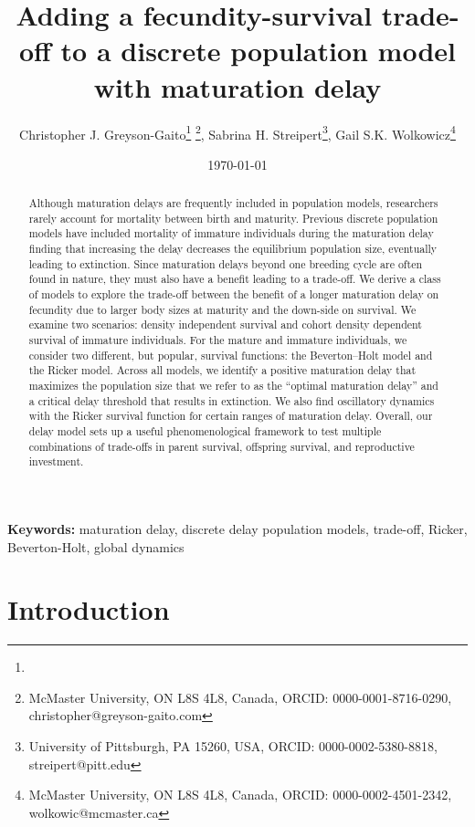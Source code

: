 \documentclass{article}
\title{Adding a fecundity-survival trade-off to a discrete population model with maturation delay}
\author{Christopher J. Greyson-Gaito\thanks{\equalcontrib} \footnote{McMaster University, ON L8S 4L8, Canada, ORCID: 0000-0001-8716-0290, christopher@greyson-gaito.com}, Sabrina H. Streipert\footnotemark[1] \footnote{University of Pittsburgh, PA 15260, USA, ORCID: 0000-0002-5380-8818, streipert@pitt.edu}, Gail S.K. Wolkowicz\footnotemark[1] \footnote{McMaster University, ON L8S 4L8, Canada, ORCID: 0000-0002-4501-2342, wolkowic@mcmaster.ca}}
\date{\today}
\numberwithin{theorem}{section}
\begin{document}
\maketitle


\begin{abstract}
Although maturation delays are frequently included in population models, researchers rarely account for mortality between birth and maturity. Previous discrete population models have included mortality of immature individuals during the maturation delay finding that increasing the delay decreases the equilibrium population size, eventually leading to extinction. Since maturation delays beyond one breeding cycle are often found in nature, they must also have a benefit leading to a trade-off.  We derive a class of models to explore the trade-off between the benefit  of a longer maturation delay on fecundity due to  larger body sizes at maturity  and the down-side on survival. We examine two scenarios: density independent survival and cohort density dependent survival of immature individuals. For the mature and immature individuals, we consider two different, but popular, survival functions: the Beverton--Holt model and the Ricker model. Across all models, we identify a positive maturation delay that maximizes the population size that we refer to as  the ``optimal maturation delay'' and a critical delay threshold that results in extinction. We also find oscillatory dynamics with the Ricker survival function for certain ranges of maturation delay. Overall, our delay model sets up a useful phenomenological framework to test multiple combinations of trade-offs in parent survival, offspring survival, and reproductive investment.
\end{abstract}

\textbf{Keywords:} maturation delay, discrete delay population models, trade-off, Ricker, Beverton-Holt, global dynamics

\section{Introduction} 
\end{document}
